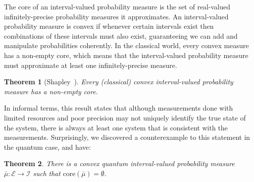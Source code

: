 \documentclass[12pt]{iopart}
\theoremstyle{plain}
\newtheorem{thm}{Theorem}
\theoremstyle{definition}
\theoremstyle{remark}
\newcommand{\events}{\ensuremath{\mathcal{E}}}
\begin{document}
\noindent The core of an interval-valued probability measure is the
set of real-valued infinitely-precise probability measures it approximates.
An interval-valued probability measure is convex if whenever certain
intervals exist then combinations of these intervals must also exist,
guaranteeing we can add and manipulate probabilities coherently. In
the classical world, every convex measure has a non-empty core, which
means that the interval-valued probability measure must approximate
at least one infinitely-precise measure.

\begin{thm}[Shapley~\cite{Shapley1971,Grabisch2016}]\label{thm:Shapley}
Every (classical) convex interval-valued probability measure has a
non-empty core. \end{thm}

In informal terms, this result states that although measurements done
with limited resources and poor precision may not uniquely identify
the true state of the system, there is always at least one system
that is consistent with the measurements. Surprisingly, we discovered
a counterexample to this statement in the quantum case, and have:

\begin{thm}\label{def:EmptyCoreQuantumInterval-valuedProbability}
There is a convex quantum interval-valued probability measure~$\bar{\mu}:\events\rightarrow\mathscr{I}$
such that $\mathrm{core}\left(\bar{\mu}\right)=\emptyset$.\end{thm}
\end{document}
